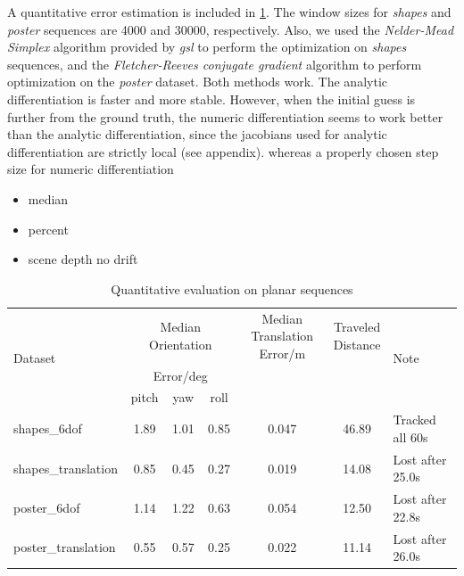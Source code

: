 A quantitative error estimation is included in \cref{tab:err_est}. The
window sizes for \textit{shapes} and \textit{poster} sequences are
4000 and 30000, respectively. Also, we used the \textit{Nelder-Mead
  Simplex} algorithm provided by \textit{gsl} to perform the
optimization on \textit{shapes} sequences, and the
\textit{Fletcher-Reeves conjugate gradient} algorithm to perform
optimization on the \textit{poster} dataset. Both methods work. The
analytic differentiation is faster and more stable. However, when the
initial guess is further from the ground truth, the numeric
differentiation seems to work better than the analytic
differentiation, since the jacobians used for analytic differentiation
are strictly local (see appendix). whereas a properly chosen step size for numeric
differentiation
\begin{itemize}
\item median\\
  \item percent\\
  \item scene depth no drift\\
\end{itemize}

\begin{table}[h]
  \label{tab:err_est}
  \begin{center}
    \begin{tabular}{lcccccl}
      \hline
      \multirow{3}{*}{Dataset}&\multicolumn{3}{c}{Median Orientation}&\multirowcell{3}{Median Translation \\ Error/m}&\multirowcell{3}{Traveled\\Distance}&\multirow{3}{*}{Note}\\
                              &\multicolumn{3}{c}{Error/deg}& &\\
      \cline{2-4}
                              & pitch&  yaw & roll &       &       &                  \\
      \hline
      shapes\_6dof        & 1.89 & 1.01 & 0.85 & 0.047 & 46.89 & Tracked all 60s  \\
      shapes\_translation & 0.85 & 0.45 & 0.27 & 0.019 & 14.08 & Lost after 25.0s \\
      poster\_6dof        & 1.14 & 1.22 & 0.63 & 0.054 & 12.50 & Lost after 22.8s \\
      poster\_translation & 0.55 & 0.57 & 0.25 & 0.022 & 11.14 & Lost after 26.0s \\
      \hline
    \end{tabular}
  \end{center}
  \caption{Quantitative evaluation on planar sequences}
\end{table}


